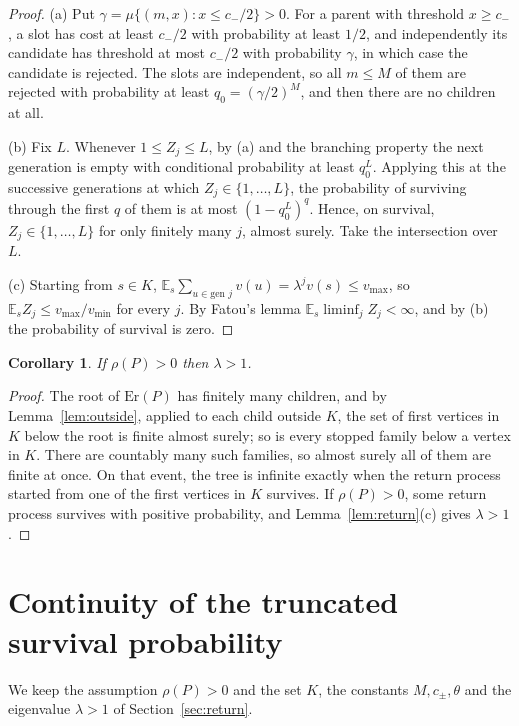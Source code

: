 \documentclass[11pt]{amsart}
\newtheorem{corollary}[theorem]{Corollary}
\theoremstyle{remark}
\numberwithin{equation}{section}
\newcommand{\E}{\mathbb E}
\newcommand{\1}{\mathbf 1}
\newcommand{\Er}{\mathrm{Er}}
\begin{document}
\begin{proof}
(a) Put $\gamma=\mu\{(m,x):x\le c_-/2\}>0$. For a parent with threshold $x\ge c_-$, a slot has cost at least $c_-/2$ with probability at least $1/2$, and independently its candidate has threshold at most $c_-/2$ with probability $\gamma$, in which case the candidate is rejected. The slots are independent, so all $m\le M$ of them are rejected with probability at least $q_0=(\gamma/2)^M$, and then there are no children at all.

(b) Fix $L$. Whenever $1\le Z_j\le L$, by (a) and the branching property the next generation is empty with conditional probability at least $q_0^L$. Applying this at the successive generations at which $Z_j\in\{1,\dots,L\}$, the probability of surviving through the first $q$ of them is at most $(1-q_0^L)^q$. Hence, on survival, $Z_j\in\{1,\dots,L\}$ for only finitely many $j$, almost surely. Take the intersection over $L$.

(c) Starting from $s\in K$, $\E_s\sum_{u\in\text{gen }j}v(u)=\lambda^jv(s)\le v_{\max}$, so $\E_sZ_j\le v_{\max}/v_{\min}$ for every $j$. By Fatou's lemma $\E_s\liminf_jZ_j<\infty$, and by (b) the probability of survival is zero.
\end{proof}

\begin{corollary}\label{cor:lambda}
If $\rho(P)>0$ then $\lambda>1$.
\end{corollary}

\begin{proof}
The root of $\Er(P)$ has finitely many children, and by Lemma~\ref{lem:outside}, applied to each child outside $K$, the set of first vertices in $K$ below the root is finite almost surely; so is every stopped family below a vertex in $K$. There are countably many such families, so almost surely all of them are finite at once. On that event, the tree is infinite exactly when the return process started from one of the first vertices in $K$ survives. If $\rho(P)>0$, some return process survives with positive probability, and Lemma~\ref{lem:return}(c) gives $\lambda>1$.
\end{proof}

\section{Continuity of the truncated survival probability}\label{sec:continuity}

We keep the assumption $\rho(P)>0$ and the set $K$, the constants $M,c_\pm,\theta$ and the eigenvalue $\lambda>1$ of Section~\ref{sec:return}.
\end{document}
